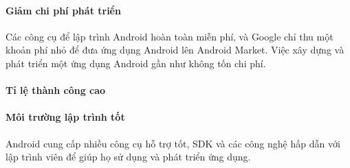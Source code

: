 \documentclass[a4paper]{article}
\begin{document}
\paragraph*{Giảm chi phí phát triển}
Các công cụ để lập trình Android hoàn toàn miễn phí, và Google chỉ thu một khoản phí nhỏ để đưa ứng dụng Android lên Android Market. Việc xây dựng và phát triển một ứng dụng Android gần như không tốn chi phí.
\paragraph*{Tỉ lệ thành công cao}
\paragraph*{Môi trường lập trình tốt}
Android cung cấp nhiều công cụ hỗ trợ tốt, SDK và các công nghệ hấp dẫn với lập trình viên để giúp họ sử dụng và phát triển ứng dụng.
\newpage
\end{document}
